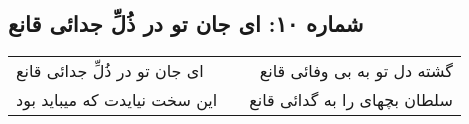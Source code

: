\begin{center}
\section*{شماره ۱۰: ای جان تو در ذُلِّ جدائی قانع}
\label{sec:010}
\begin{longtable}{l p{0.5cm} r}
ای جان تو در ذُلِّ جدائی قانع
&&
گشته دل تو به بی وفائی قانع
\\
این سخت نیایدت که میباید بود
&&
سلطان بچهای را به گدائی قانع
\\
\end{longtable}
\end{center}
